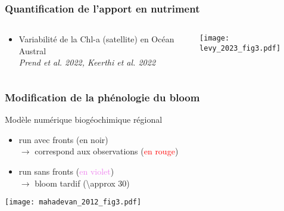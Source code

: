 \documentclass[11pt, french, aspectratio=32]{beamer}
\begin{document}
\begin{frame}
  \frametitle{Quantification de l'apport en nutriment}
  \begin{columns}
    \begin{column}{0.5\linewidth}
      \begin{itemize}
        \item Variabilité de la Chl-a (satellite) en Océan Austral
              \\
              {\footnotesize\textit{Prend et al. 2022, Keerthi et al. 2022}}
      \end{itemize}
    \end{column}
    \begin{column}{0.5\linewidth}
      \texttt{[image: levy\_2023\_fig3.pdf]}
    \end{column}
  \end{columns}

  \vspace*{2em}

\end{frame}


\endgroup


\begin{frame}
  \frametitle{Modification de la phénologie du bloom}

  \begin{block}{}
    Modèle numérique biogéochimique régional
    \begin{itemize}
      \item run avec fronts (en noir)
            \\\(\rightarrow\) correspond aux observations (\textcolor{red}{en rouge})
      \item<2-> run sans fronts (\textcolor{violet}{en violet})
            \\\(\rightarrow\) bloom tardif (\qty{\approx 30}{})
    \end{itemize}
  \end{block}

  \texttt{[image: mahadevan\_2012\_fig3.pdf]}
  {\hspace{1em}\footnotesize\textit{\raisebox{2em}{Mahadevan et al.\ 2012}}}
\end{frame}
\end{document}
